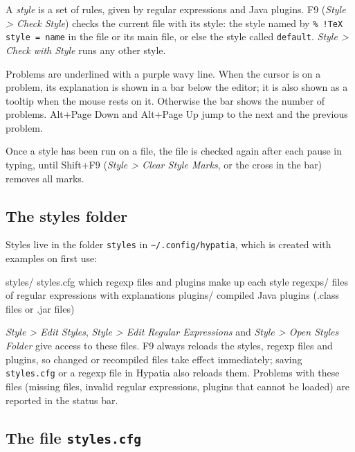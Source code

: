 \documentclass[11pt]{article}
\newcommand{\key}[1]{\textsf{#1}}
\newcommand{\menu}[1]{\textsf{\textit{#1}}}
\newcommand{\file}[1]{\texttt{#1}}
\newcommand{\cfgdir}{\texttt{\textasciitilde/.config/hypatia}}
\begin{document}
    A \emph{style} is a set of rules, given by regular expressions and Java plugins. \key{F9} (\menu{Style > Check Style}) checks the current file with its style: the style named by \verb+% !TeX style = name+ in the file or its main file, or else the style called \verb+default+. \menu{Style > Check with Style} runs any other style.

    Problems are underlined with a purple wavy line. When the cursor is on a problem, its explanation is shown in a bar below the editor; it is also shown as a tooltip when the mouse rests on it. Otherwise the bar shows the number of problems. \key{Alt+Page Down} and \key{Alt+Page Up} jump to the next and the previous problem.

    Once a style has been run on a file, the file is checked again after each pause in typing, until \key{Shift+F9} (\menu{Style > Clear Style Marks}, or the cross in the bar) removes all marks.

    \subsection{The styles folder}

    Styles live in the folder \file{styles} in \cfgdir, which is created with examples on first use:
    \begin{Code}
styles/
  styles.cfg       which regexp files and plugins make up each style
  regexps/         files of regular expressions with explanations
  plugins/         compiled Java plugins (.class files or .jar files)
    \end{Code}
    \menu{Style > Edit Styles}, \menu{Style > Edit Regular Expressions} and \menu{Style > Open Styles Folder} give access to these files. \key{F9} always reloads the styles, regexp files and plugins, so changed or recompiled files take effect immediately; saving \file{styles.cfg} or a regexp file in Hypatia also reloads them. Problems with these files (missing files, invalid regular expressions, plugins that cannot be loaded) are reported in the status bar.

    \subsection{The file \file{styles.cfg}}
\end{document}
